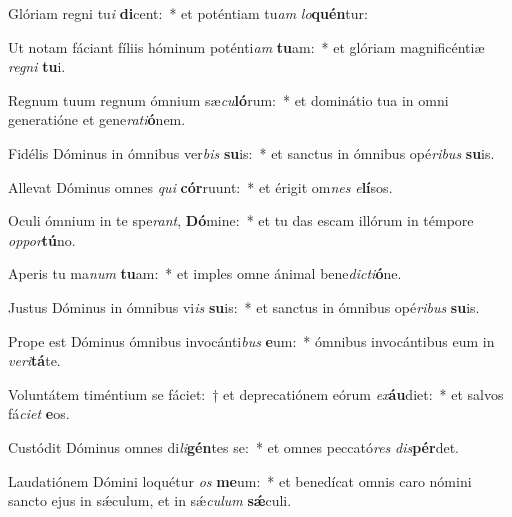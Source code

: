 \item Glóriam regni tu\textit{i} \textbf{di}cent:~* et poténtiam tu\textit{am} \textit{lo}\textbf{quén}tur:
\item Ut notam fáciant fíliis hóminum poténti\textit{am} \textbf{tu}am:~* et glóriam magnificéntiæ \textit{re}\textit{gni} \textbf{tu}i.
\item Regnum tuum regnum ómnium sæ\textit{cu}\textbf{ló}rum:~* et dominátio tua in omni generatióne et gene\textit{ra}\textit{ti}\textbf{ó}nem.
\item Fidélis Dóminus in ómnibus ver\textit{bis} \textbf{su}is:~* et sanctus in ómnibus opé\textit{ri}\textit{bus} \textbf{su}is.
\item Allevat Dóminus omnes \textit{qui} \textbf{cór}ruunt:~* et érigit om\textit{nes} \textit{e}\textbf{lí}sos.
\item Oculi ómnium in te spe\textit{rant}, \textbf{Dó}mine:~* et tu das escam illórum in témpore \textit{op}\textit{por}\textbf{tú}no.
\item Aperis tu ma\textit{num} \textbf{tu}am:~* et imples omne ánimal bene\textit{dic}\textit{ti}\textbf{ó}ne.
\item Justus Dóminus in ómnibus vi\textit{is} \textbf{su}is:~* et sanctus in ómnibus opé\textit{ri}\textit{bus} \textbf{su}is.
\item Prope est Dóminus ómnibus invocánti\textit{bus} \textbf{e}um:~* ómnibus invocántibus eum in \textit{ve}\textit{ri}\textbf{tá}te.
\item Voluntátem timéntium se fáciet:~† et deprecatiónem eórum \textit{ex}\textbf{áu}diet:~* et salvos fá\textit{ci}\textit{et} \textbf{e}os.
\item Custódit Dóminus omnes di\textit{li}\textbf{gén}tes se:~* et omnes peccató\textit{res} \textit{dis}\textbf{pér}det.
\item Laudatiónem Dómini loquétur \textit{os} \textbf{me}um:~* et benedícat omnis caro nómini sancto ejus in sǽculum, et in sǽ\textit{cu}\textit{lum} \textbf{sǽ}culi.
